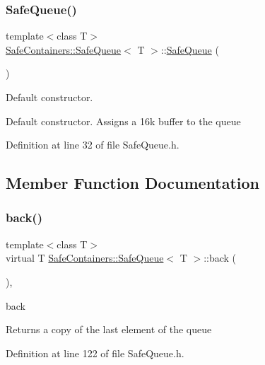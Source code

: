 \subsubsection{\texorpdfstring{SafeQueue()}{SafeQueue()}}
{\footnotesize\ttfamily template$<$class T$>$ \\
\mbox{\hyperlink{classSafeContainers_1_1SafeQueue}{Safe\+Containers\+::\+Safe\+Queue}}$<$ T $>$\+::\mbox{\hyperlink{classSafeContainers_1_1SafeQueue}{Safe\+Queue}} (\begin{DoxyParamCaption}{ }\end{DoxyParamCaption})\hspace{0.3cm}{\ttfamily [inline]}}



Default constructor. 

Default constructor. Assigns a 16k buffer to the queue 

Definition at line 32 of file Safe\+Queue.\+h.



\subsection{Member Function Documentation}
\mbox{\label{classSafeContainers_1_1SafeQueue_add5f67af0bf71f6ddc19657768606a76}} 
\subsubsection{\texorpdfstring{back()}{back()}}
{\footnotesize\ttfamily template$<$class T$>$ \\
virtual T \mbox{\hyperlink{classSafeContainers_1_1SafeQueue}{Safe\+Containers\+::\+Safe\+Queue}}$<$ T $>$\+::back (\begin{DoxyParamCaption}{ }\end{DoxyParamCaption})\hspace{0.3cm}{\ttfamily [inline]}, {\ttfamily [virtual]}}



back 

\begin{DoxyReturn}{Returns}
a copy of the last element of the queue 
\end{DoxyReturn}


Definition at line 122 of file Safe\+Queue.\+h.

